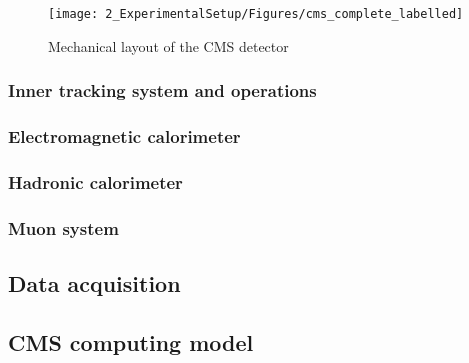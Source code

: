 			 \begin{figure}[ht]
				\centering
				\texttt{[image: 2\_ExperimentalSetup/Figures/cms\_complete\_labelled]}
				\caption{Mechanical layout of the CMS detector\cite{Collaboration:1433717}}
					\label{fig:CMS}
				\end{figure}
	

\subsubsection{Inner tracking system and operations}
\subsubsection{Electromagnetic calorimeter}
\subsubsection{Hadronic calorimeter}
\subsubsection{Muon system}

\subsection{Data acquisition}
\subsection{CMS computing model}
